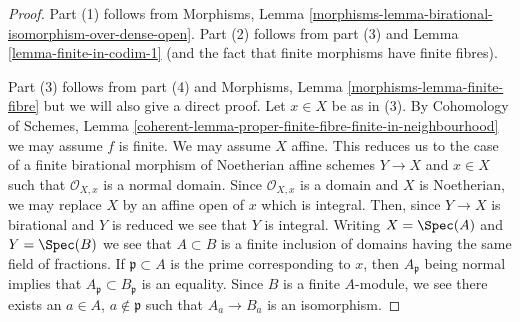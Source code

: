 \begin{proof}
Part (1) follows from Morphisms, Lemma
\ref{morphisms-lemma-birational-isomorphism-over-dense-open}.
Part (2) follows from part (3) and Lemma \ref{lemma-finite-in-codim-1}
(and the fact that finite morphisms have finite fibres).

\medskip\noindent
Part (3) follows from part (4) and
Morphisms, Lemma \ref{morphisms-lemma-finite-fibre}
but we will also give a direct proof.
Let $x \in X$ be as in (3). By
Cohomology of Schemes, Lemma
\ref{coherent-lemma-proper-finite-fibre-finite-in-neighbourhood}
we may assume $f$ is finite. We may assume $X$ affine.
This reduces us to
the case of a finite birational morphism of Noetherian affine schemes
$Y \to X$ and $x \in X$ such that $\mathcal{O}_{X, x}$ is a
normal domain. Since $\mathcal{O}_{X, x}$ is a domain and $X$
is Noetherian, we may replace $X$ by an affine open of $x$ which
is integral. Then, since $Y \to X$ is birational and $Y$ is reduced
we see that $Y$ is integral. Writing $X = \Spec(A)$ and $Y = \Spec(B)$
we see that $A \subset B$ is a finite inclusion of domains having the same
field of fractions. If $\mathfrak p \subset A$ is the prime corresponding
to $x$, then $A_\mathfrak p$ being normal implies that
$A_\mathfrak p \subset B_\mathfrak p$ is an equality.
Since $B$ is a finite $A$-module, we see there exists an
$a \in A$, $a \not \in \mathfrak p$ such that $A_a \to B_a$
is an isomorphism.


\end{proof}
